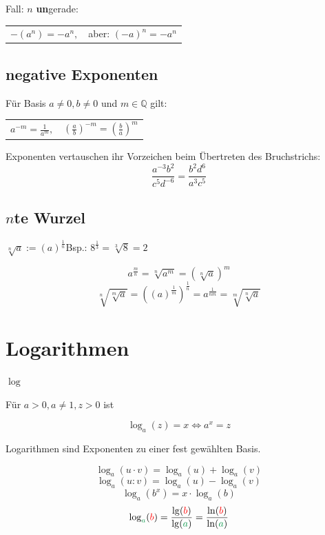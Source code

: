 \begin{multicols}{2}
Fall: $n$ \textbf{un}gerade:

\begin{tabular}{cc}
 $-(a^n) = -a^n,$ & aber: $(-a)^n = -a^n$\\
 \end{tabular} 


\subsection*{negative Exponenten}

Für Basis $a\ne 0, b\ne 0$ und $m \in\mathbb{Q}$ gilt:

\begin{tabular}{cc}
$a^{-m} = \frac1{a^m},$ & $\left(\frac{a}b\right)^{-m} = \left(\frac{b}a\right)^m$ \\
 \end{tabular}

Exponenten vertauschen ihr Vorzeichen beim Übertreten des Bruchstrichs:
$$\frac{a^{-3}b^2}{c^5d^{-6}} = \frac{b^2d^6}{a^3c^5}$$


\subsection*{$n$te Wurzel}
$\sqrt[n]{a} := \left(a\right)^\frac1n$\hfill{}Bsp.: $8^{\frac13}=\sqrt[3]{8}=2$

$$a^{\frac{m}n} = \sqrt[n]{a^m} = \left(\sqrt[n]a\right)^m$$
$$\sqrt[n]{\sqrt[m]{a}}   = \left((a)^\frac1m \right)^\frac1n = a^\frac1{nm} = \sqrt[m]{\sqrt[n]{a}}  $$


\forceCB
\section*{Logarithmen}

\begin{definition*}{$\log$}{}

Für $a>0, a\ne 1, z>0$ ist

$$\log_a{}(z)=x \Longleftrightarrow{} a^x = z$$
\end{definition*}

Logarithmen sind Exponenten zu einer fest gewählten Basis.

\begin{gesetz*}{}{}
$$\log_a(u\cdot v) = \log_a(u) + \log_a(v)$$
$$\log_a(u : v) = \log_a(u) - \log_a(v)$$
$$\log_a(b^x) = x\cdot{}\log_a(b)$$
$$\log_{\color{ForestGreen}a}({\color{red}b}) = \frac{\lg({\color{red}b})}{\lg({\color{ForestGreen}a})} = \frac{\ln({\color{red}b})}{\ln({\color{ForestGreen}a})}$$
\end{gesetz*}




\end{multicols}
